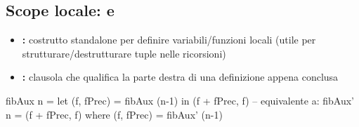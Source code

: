 \subsection{Scope locale:  e }
\begin{itemize}
    \item \textbf{:} costrutto standalone per definire variabili/funzioni locali (utile per strutturare/destrutturare tuple nelle ricorsioni)
    \item \textbf{:} clausola che qualifica la parte destra di una definizione appena conclusa
\end{itemize}
\begin{haskellbox}{}
fibAux n = let (f, fPrec) = fibAux (n-1) in (f + fPrec, f)
-- equivalente a:
fibAux' n = (f + fPrec, f) where (f, fPrec) = fibAux' (n-1)
\end{haskellbox}

